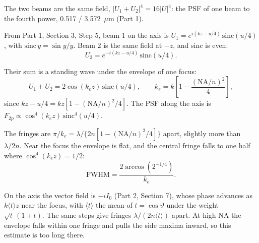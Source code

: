 \documentclass[11pt]{article}
\begin{document}
 The two beams are the same field, $|U_1 + U_2|^4 = 16|U|^4$: the PSF of one beam to the
fourth power, 0.517 / 3.572~$\mu$m (Part 1).

 From Part 1, Section 3, Step 5, beam 1 on the
axis is $U_1 = e^{i(kz - u/4)}\,\mathrm{sinc}(u/4)$, with $\mathrm{sinc}\,y = \sin y/y$. Beam 2 is the same field at
$-z$, and sinc is even:
\begin{equation}U_2 = e^{-i(kz - u/4)}\,\mathrm{sinc}(u/4) .\end{equation}

 Their sum is a standing wave under the envelope of one focus:
\begin{equation}U_1 + U_2 = 2\cos(k_ez)\,\mathrm{sinc}(u/4),\qquad k_e = k\left[1 - \frac{(\mathrm{NA}/n)^2}{4}\right] ,\end{equation}
since $kz - u/4 = kz[1 - (\mathrm{NA}/n)^2/4]$. The PSF along the axis is
$F_{2p} \propto \cos^4(k_ez)\,\mathrm{sinc}^4(u/4)$.

 The fringes are $\pi/k_e = \lambda/\{2n[1 - (\mathrm{NA}/n)^2/4]\}$ apart, slightly more than $\lambda/2n$.
Near the focus the envelope is flat, and the central fringe falls to one half where $\cos^4(k_ez) = 1/2$:
\begin{equation}\text{FWHM} = \frac{2\arccos(2^{-1/4})}{k_e} .\end{equation}

 On the axis the vector field is $-iI_0$ (Part 2, Section 7), whose phase advances as
$k\langle t\rangle z$ near the focus, with $\langle t\rangle$ the mean of $t = \cos\vartheta$ under the weight
$\sqrt t\,(1 + t)$. The same steps give fringes $\lambda/(2n\langle t\rangle)$ apart. At high NA the envelope falls
within one fringe and pulls the side maxima inward, so this estimate is too long there.

\end{document}
